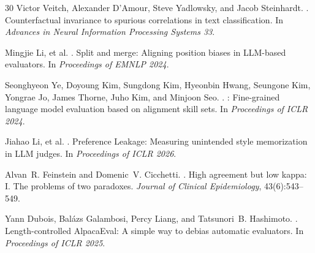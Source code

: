 \documentclass[11pt,a4paper]{article}
\begin{document}
\begin{thebibliography}{30}
Victor Veitch, Alexander D'Amour, Steve Yadlowsky, and Jacob Steinhardt.
.
\newblock Counterfactual invariance to spurious correlations in text classification.
\newblock In \emph{Advances in Neural Information Processing Systems 33}.

Mingjie Li, et al.
.
\newblock Split and merge: Aligning position biases in {LLM}-based evaluators.
\newblock In \emph{Proceedings of EMNLP 2024}.

Seonghyeon Ye, Doyoung Kim, Sungdong Kim, Hyeonbin Hwang, Seungone Kim, Yongrae Jo, James Thorne, Juho Kim, and Minjoon Seo.
.
: Fine-grained language model evaluation based on alignment skill sets.
\newblock In \emph{Proceedings of ICLR 2024}.

Jiahao Li, et al.
.
\newblock Preference Leakage: Measuring unintended style memorization in {LLM} judges.
\newblock In \emph{Proceedings of ICLR 2026}.

Alvan~R. Feinstein and Domenic~V. Cicchetti.
.
\newblock High agreement but low kappa: {I. The} problems of two paradoxes.
\newblock \emph{Journal of Clinical Epidemiology}, 43(6):543--549.

Yann Dubois, Bal\'{a}zs Galambosi, Percy Liang, and Tatsunori~B. Hashimoto.
.
\newblock Length-controlled {AlpacaEval}: A simple way to debias automatic evaluators.
\newblock In \emph{Proceedings of ICLR 2025}.

\end{thebibliography}
\end{document}
